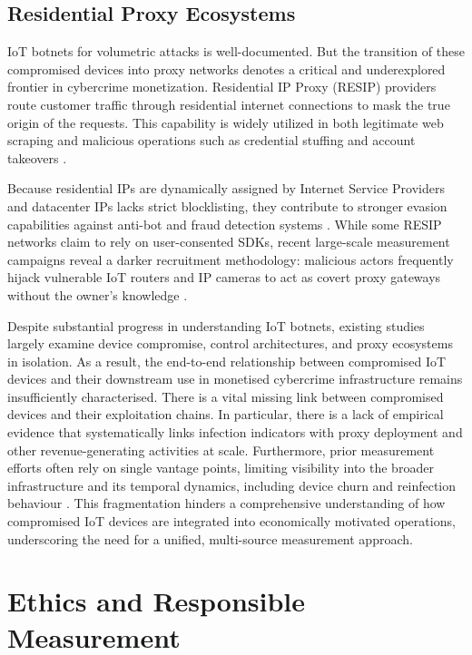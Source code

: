 \documentclass[journal]{IEEEtran}
\begin{document}
\subsection{Residential Proxy Ecosystems}

IoT botnets for volumetric attacks is well-documented. But the transition of these compromised devices into proxy networks denotes a critical and underexplored frontier in cybercrime monetization. Residential IP Proxy (RESIP) providers route customer traffic through residential internet connections to mask the true origin of the requests. This capability is widely utilized in both legitimate web scraping and malicious operations such as credential stuffing and account takeovers \cite{chiapponi2023inside}.

Because residential IPs are dynamically assigned by Internet Service Providers and datacenter IPs lacks strict blocklisting, they contribute to stronger evasion capabilities against anti-bot and fraud detection systems \cite{chiapponi2023inside}. While some RESIP networks claim to rely on user-consented SDKs, recent large-scale measurement campaigns reveal a darker recruitment methodology: malicious actors frequently hijack vulnerable IoT routers and IP cameras to act as covert proxy gateways without the owner's knowledge \cite{chiapponi2023inside}.

Despite substantial progress in understanding IoT botnets, existing studies largely examine device compromise, control architectures, and proxy ecosystems in isolation. As a result, the end-to-end relationship between compromised IoT devices and their downstream use in monetised cybercrime infrastructure remains insufficiently characterised. There is a vital missing link between compromised devices and their exploitation chains. In particular, there is a lack of empirical evidence that systematically links infection indicators with proxy deployment and other revenue-generating activities at scale. Furthermore, prior measurement efforts often rely on single vantage points, limiting visibility into the broader infrastructure and its temporal dynamics, including device churn and reinfection behaviour \cite{lever2017lustrum, paine2024seven}. This fragmentation hinders a comprehensive understanding of how compromised IoT devices are integrated into economically motivated operations, underscoring the need for a unified, multi-source measurement approach.

\section{Ethics and Responsible Measurement}
\label{sec:ethics}
\end{document}
